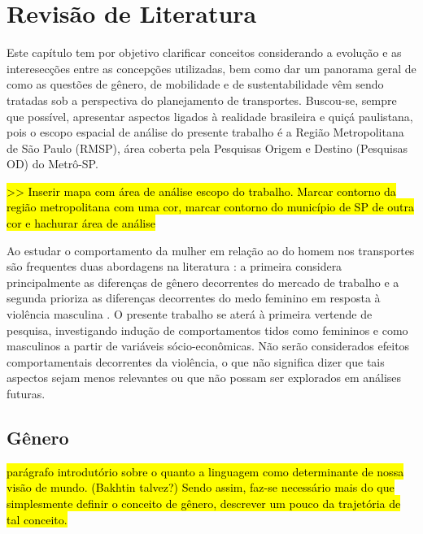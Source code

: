 \chapter{Revisão de Literatura}\label{chap:revisao-literatura}

Este capítulo tem por objetivo clarificar conceitos considerando a evolução e as interesecções entre as concepções utilizadas, bem como dar um panorama geral de como as questões de gênero, de mobilidade e de sustentabilidade vêm sendo tratadas sob a perspectiva do planejamento de transportes. 
Buscou-se, sempre que possível, apresentar aspectos ligados à realidade brasileira e quiçá paulistana, pois o escopo espacial de análise do presente trabalho é a Região Metropolitana de São Paulo (RMSP), área coberta pela Pesquisas Origem e Destino (Pesquisas OD) do Metrô-SP. 

\hl{>> Inserir mapa com área de análise escopo do trabalho. Marcar contorno da região metropolitana com uma cor, marcar contorno do município de SP de outra cor e hachurar área de análise} %

Ao estudar o comportamento da mulher em relação ao do homem nos transportes são frequentes duas abordagens na literatura \cite{BEST2005}: a primeira considera principalmente as diferenças de gênero decorrentes do mercado de trabalho \cite{HANSON1985} e a segunda prioriza as diferenças decorrentes do medo feminino em resposta à violência masculina \cite{TRENCH1992}.
O presente trabalho se aterá à primeira vertende de pesquisa, investigando indução de comportamentos tidos como femininos e como masculinos a partir de variáveis sócio-econômicas. Não serão considerados efeitos comportamentais decorrentes da violência, o que não significa dizer que tais aspectos sejam menos relevantes ou que não possam ser explorados em análises futuras.

\clearpage

\section{Gênero}

\hl{parágrafo introdutório sobre o quanto a linguagem como determinante de nossa visão de mundo. (Bakhtin talvez?)
Sendo assim, faz-se necessário mais do que simplesmente definir o conceito de gênero, descrever um pouco da trajetória de tal conceito.} %

